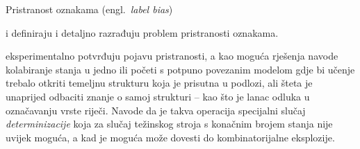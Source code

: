 Pristranost oznakama (engl.~\emph{label bias})

\citet*{lafferty2001conditional} i \citet*{leon1991approche} definiraju i
detaljno razrađuju problem pristranosti oznakama.

\citet*{lafferty2001conditional} eksperimentalno potvrđuju pojavu pristranosti,
a kao moguća rješenja navode kolabiranje stanja u jedno %
ili početi s potpuno povezanim modelom gdje bi učenje trebalo otkriti temeljnu strukturu koja je prisutna u podlozi, ali šteta je unaprijed odbaciti znanje o
samoj strukturi -- kao što je lanac odluka u označavanju vrste riječi.
Navode da je takva operacija specijalni slučaj \emph{determinizacije} koja za
slučaj težinskog stroja s konačnim brojem stanja nije uvijek moguća, a kad je
moguća može dovesti do kombinatorijalne eksplozije.
